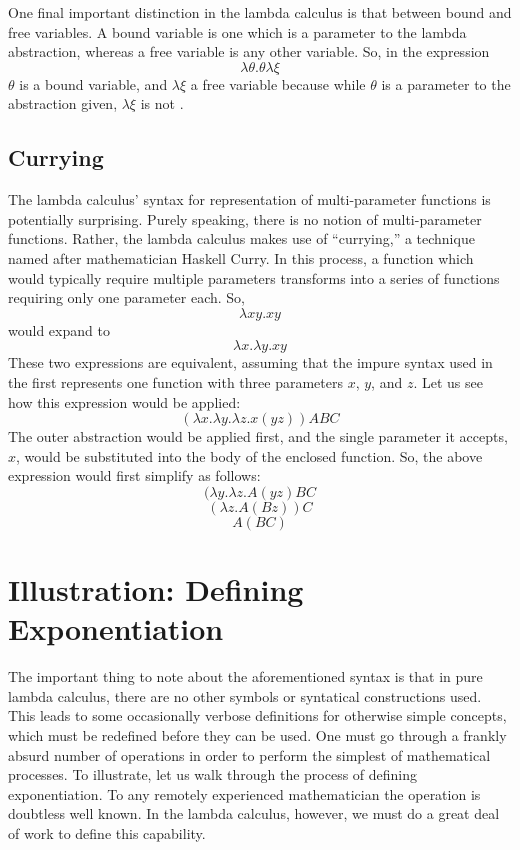 \documentclass[twocolumn,titlepage,12pt]{article}
\begin{document}
One final important distinction in the lambda calculus is that between bound and free variables. A bound variable is one which is a parameter to the lambda abstraction, whereas a free variable is any other variable. So, in the expression
$$\lambda \theta.\theta \lambda \xi$$
$\theta$ is a bound variable, and $\lambda \xi$ a free variable because while $\theta$ is a parameter to the abstraction given, $\lambda \xi$ is not \cite{stanfordlc}.

\subsection{Currying}
The lambda calculus' syntax for representation of multi-parameter functions is potentially surprising. Purely speaking, there is no notion of multi-parameter functions. Rather, the lambda calculus makes use of ``currying,'' a technique named after mathematician Haskell Curry. In this process, a function which would typically require multiple parameters transforms into a series of functions requiring only one parameter each. So,
$$\lambda xy.xy$$
would expand to
$$\lambda x.\lambda y.xy$$
These two expressions are equivalent, assuming that the impure syntax used in the first represents one function with three parameters $x$, $y$, and $z$. Let us see how this expression would be applied:
$$(\lambda x.\lambda y.\lambda z.x(yz))ABC$$
The outer abstraction would be applied first, and the single parameter it accepts, $x$, would be substituted into the body of the enclosed function. So, the above expression would first simplify as follows:
$$(\lambda y.\lambda z.A(yz)BC$$
$$(\lambda z.A(Bz))C$$
$$A(BC)$$

\section{Illustration: Defining Exponentiation}
The important thing to note about the aforementioned syntax is that in pure lambda calculus, there are no other symbols or syntatical constructions used. This leads to some occasionally verbose definitions for otherwise simple concepts, which must be redefined before they can be used. One must go through a frankly absurd number of operations in order to perform the simplest of mathematical processes. To illustrate, let us walk through the process of defining exponentiation. To any remotely experienced mathematician the operation is doubtless well known. In the lambda calculus, however, we must do a great deal of work to define this capability.
\end{document}
